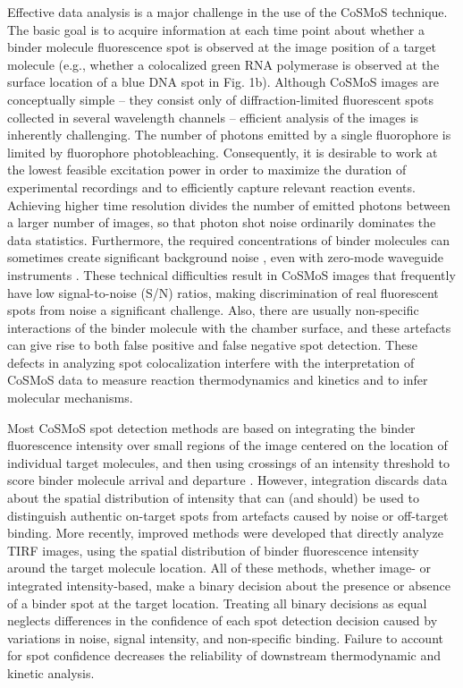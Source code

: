 Effective data analysis is a major challenge in the use of the CoSMoS technique. The basic goal is to acquire information at each time point about whether a binder molecule fluorescence spot is observed at the image position of a target molecule (e.g., whether a colocalized green RNA polymerase is observed at the surface location of a blue DNA spot in Fig. 1b). Although CoSMoS images are conceptually simple -- they consist only of diffraction-limited fluorescent spots collected in several wavelength channels -- efficient analysis of the images is inherently challenging. The number of photons emitted by a single fluorophore is limited by fluorophore photobleaching. Consequently, it is desirable to work at the lowest feasible excitation power in order to maximize the duration of experimental recordings and to efficiently capture relevant reaction events. Achieving higher time resolution divides the number of emitted photons between a larger number of images, so that photon shot noise ordinarily dominates the data statistics. Furthermore, the required concentrations of binder molecules can sometimes create significant background noise \cite{Peng2018-ge, Van_Oijen2011-ig}, even with zero-mode waveguide instruments \cite{Chen2014-jd}. These technical difficulties result in CoSMoS images that frequently have low signal-to-noise (S/N) ratios, making discrimination of real fluorescent spots from noise a significant challenge. Also, there are usually non-specific interactions of the binder molecule with the chamber surface, and these artefacts can give rise to both false positive and false negative spot detection. These defects in analyzing spot colocalization interfere with the interpretation of CoSMoS data to measure reaction thermodynamics and kinetics and to infer molecular mechanisms.

Most CoSMoS spot detection methods are based on integrating the binder fluorescence intensity over small regions of the image  centered on the location of individual target molecules, and then using crossings of an intensity threshold to score binder molecule arrival and departure \cite{Friedman2015-nx}. However, integration discards data about the spatial distribution of intensity that can (and should) be used to distinguish authentic on-target spots from artefacts caused by noise or off-target binding.  More recently, improved methods \cite{Friedman2015-nx,Smith2019-yb} were developed that directly analyze TIRF images, using the spatial distribution of binder fluorescence intensity around the target molecule location. All of these methods, whether image- or integrated intensity-based, make a binary decision about the presence or absence of a binder spot at the target location.  Treating all binary decisions as equal neglects differences in the confidence of each spot detection decision caused by variations in noise, signal intensity, and non-specific binding.  Failure to account for spot confidence decreases the reliability of downstream thermodynamic and kinetic analysis.

